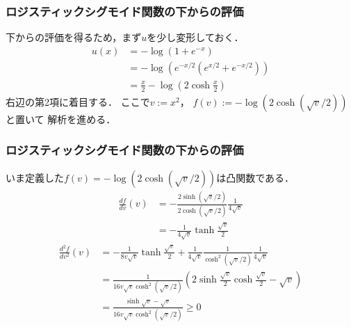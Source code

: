 \documentclass[10pt,usepdftitle=false,hyperref={unicode}]{beamer}
\newcommand{\parentheses}[1]{\left(#1\right)}
\begin{document}
\begin{frame}
\frametitle{ロジスティックシグモイド関数の下からの評価}
下からの評価を得るため，まず$u$を少し変形しておく．
\begin{align*}
    u\parentheses{x}
    &= -\log\parentheses{1 + e^{-x}} \\
    &= -\log\parentheses{e^{-x/2}\parentheses{e^{x/2} + e^{-x/2}}} \\
    &= \frac{x}{2} - \log\parentheses{2\cosh\frac{x}{2}}
\end{align*}
右辺の第2項に着目する．
ここで$v := x^2$，
$f\parentheses{v} := - \log\parentheses{2\cosh\parentheses{\sqrt{v}/2}}$と置いて
解析を進める．
\end{frame}

\begin{frame}
\frametitle{ロジスティックシグモイド関数の下からの評価}
いま定義した$f\parentheses{v} = - \log\parentheses{2\cosh\parentheses{\sqrt{v}/2}}$は凸関数である．
\begin{align*}
    \frac{df}{dv}\parentheses{v}
    &= -\frac{2\sinh\parentheses{\sqrt{v}/2}}{2\cosh\parentheses{\sqrt{v}/2}}\frac{1}{4\sqrt{v}} \\
    &= -\frac{1}{4\sqrt{v}}\tanh\frac{\sqrt{v}}{2}
\end{align*}
\begin{align*}
    \frac{d^2f}{dv^2}\parentheses{v}
    &= -\frac{1}{8v\sqrt{v}} \tanh\frac{\sqrt{v}}{2}
    +\frac{1}{4\sqrt{v}}\frac{1}{\cosh^2\parentheses{\sqrt{v}/2}}\frac{1}{4\sqrt{v}} \\
    &= \frac{1}{16v\sqrt{v}\cosh^2\parentheses{\sqrt{v}/2}}\parentheses{2\sinh\frac{\sqrt{v}}{2}\cosh\frac{\sqrt{v}}{2} - \sqrt{v}} \\
    &= \frac{\sinh \sqrt{v} - \sqrt{v}}{16v\sqrt{v}\cosh^2\parentheses{\sqrt{v}/2}} \geq 0
\end{align*}
\end{frame}
\end{document}
